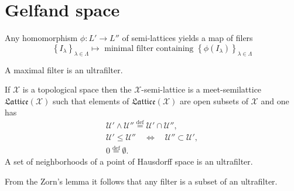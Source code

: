 \documentclass{beamer}
\theoremstyle{plain}
\newcommand{\be}{\begin{equation}}
\newcommand{\ee}{\end{equation}}
\newcommand{\sU}{\mathcal{U}}       %
\newcommand{\sX}{\mathcal{X}}       %
\newcommand{\la}{\lambda}
\newcommand{\La}{\Lambda}
\newcommand{\bydef}{\stackrel{\mathrm{def}}{=}}
\begin{document}
\section{Gelfand space}
\begin{frame}
		Any homomorphism $\phi : L' \to L''$ of {semi}-{lattices} yields a map
		of filers
		\be\label{filtermap_eqn}
		\left\{I_\la\right\}_{\la \in \La}	\mapsto \text{ minimal filter containing } \left\{\phi\left( I_\la\right) \right\}_{\la \in \La}
		\ee
\begin{definition}\label{ultra_filter_defn}
	A maximal filter is an \alert{ultrafilter}.
\end{definition}		
		\begin{example}\label{space_semi_exm}
			If $\sX$ is a topological space then the $\sX$-\alert{semi}-\alert{lattice} is  a  meet-semilattice $\mathfrak{Lattice}\left( \sX\right)$ such that elements of $\mathfrak{Lattice}\left( \sX\right)$ are open subsets of $\sX$ and one has
			\be\label{x_lat_eqn}
			\begin{split}
				\sU' \wedge \sU''\bydef \sU' \cap \sU'',\\
				\sU' \le \sU'' \quad \Leftrightarrow\quad \sU'' \subset \sU',\\
				0 \bydef \emptyset.
			\end{split}
			\ee
			A set of neighborhoods of a point of Hausdorff space is an ultrafilter.
		\end{example}
	\label{ultra_filter_rem}
			From the Zorn’s lemma it follows that any filter is a subset of an	ultrafilter.

		
	\end{frame}
\end{document}
